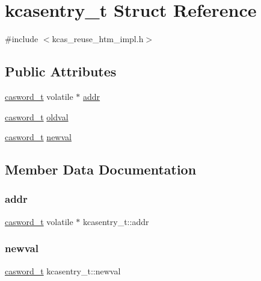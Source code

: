 \hypertarget{structkcasentry__t}{}\section{kcasentry\+\_\+t Struct Reference}
\label{structkcasentry__t}


{\ttfamily \#include $<$kcas\+\_\+reuse\+\_\+htm\+\_\+impl.\+h$>$}

\subsection*{Public Attributes}
\begin{DoxyCompactItemize}
\item 
\hyperlink{rq__unsafe_8h_ad45142aaf2ff20a036dc6242b8483e9c}{casword\+\_\+t} volatile $\ast$ \hyperlink{structkcasentry__t_aeb4001c54a80cbfc52d7ecab4996db53}{addr}
\item 
\hyperlink{rq__unsafe_8h_ad45142aaf2ff20a036dc6242b8483e9c}{casword\+\_\+t} \hyperlink{structkcasentry__t_a9043bad3ce4e0a566196667d039f3380}{oldval}
\item 
\hyperlink{rq__unsafe_8h_ad45142aaf2ff20a036dc6242b8483e9c}{casword\+\_\+t} \hyperlink{structkcasentry__t_a370f7727007a45210cc3585376e456d8}{newval}
\end{DoxyCompactItemize}


\subsection{Member Data Documentation}
\mbox{\label{structkcasentry__t_aeb4001c54a80cbfc52d7ecab4996db53}} 
\subsubsection{\texorpdfstring{addr}{addr}}
{\footnotesize\ttfamily \hyperlink{rq__unsafe_8h_ad45142aaf2ff20a036dc6242b8483e9c}{casword\+\_\+t} volatile $\ast$ kcasentry\+\_\+t\+::addr}

\mbox{\label{structkcasentry__t_a370f7727007a45210cc3585376e456d8}} 
\subsubsection{\texorpdfstring{newval}{newval}}
{\footnotesize\ttfamily \hyperlink{rq__unsafe_8h_ad45142aaf2ff20a036dc6242b8483e9c}{casword\+\_\+t} kcasentry\+\_\+t\+::newval}

